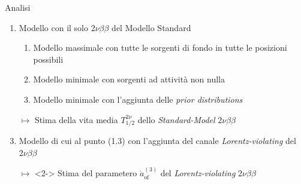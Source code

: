 \documentclass[10pt]{beamer}
\newcommand{\aof}{\mathring{a}_\text{of}^{(3)}}
\newcommand{\nbb}{\nu\beta\beta}
\newcommand{\Tnu}{T_{1/2}^{2\nu}}
\begin{document}
\begin{frame}[label=16]{Analisi}
	\begin{enumerate}
		\item Modello con il solo $2\nbb$ del Modello Standard
		\begin{enumerate}
			\item Modello massimale con tutte le sorgenti di fondo in tutte le posizioni possibili
			\item Modello minimale con sorgenti ad attività non nulla
			\item Modello minimale con l'aggiunta delle \textit{prior distributions}
		\end{enumerate}
		\item[$\longmapsto$] \alert{Stima della vita media $\Tnu$ dello \textit{Standard-Model} $2\nbb$}
		\item<2-> Modello di cui al punto (1.3) con l'aggiunta del canale \textit{Lorentz-violating} del $2\nbb$
		\item[$\longmapsto$]<2-> \alert{Stima del parametero $\aof$ del \textit{Lorentz-violating} $2\nbb$}
	\end{enumerate}
\end{frame}
\tikzexternaldisable
\end{document}
